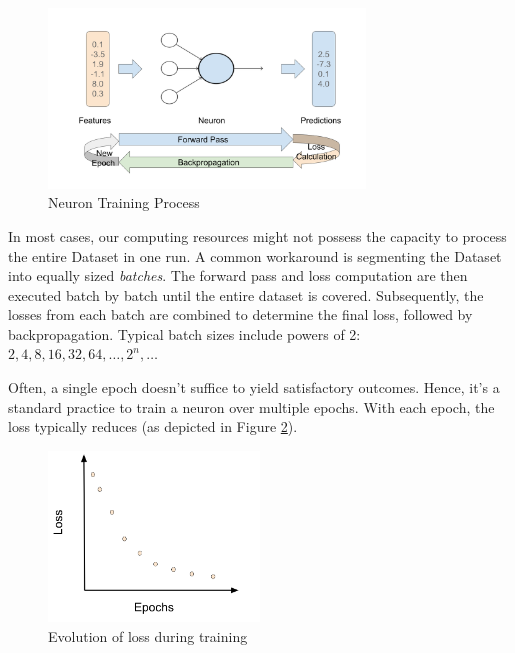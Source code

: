 \begin{figure}
\centering
\includegraphics[width=0.75\textwidth]{Figures/02/02_neuron_training.png}
\caption{Neuron Training Process}
\label{fig:02_nn_neuron_training}
\end{figure}

In most cases, our computing resources might not possess the capacity to process the entire Dataset in one run. A common workaround is segmenting the Dataset into equally sized \emph{batches}. The forward pass and loss computation are then executed batch by batch until the entire dataset is covered. Subsequently, the losses from each batch are combined to determine the final loss, followed by backpropagation. Typical batch sizes include powers of 2: $2, 4, 8, 16, 32, 64, \ldots, 2^n, \ldots$

Often, a single epoch doesn't suffice to yield satisfactory outcomes. Hence, it's a standard practice to train a neuron over multiple epochs. With each epoch, the loss typically reduces (as depicted in Figure \ref{fig:02_nn_loss_evolution}).

\begin{figure}
    \centering
    \includegraphics[width=0.5\textwidth]{Figures/02/02_loss_evolution.png}
    \caption{Evolution of loss during training}
    \label{fig:02_nn_loss_evolution}
\end{figure}


